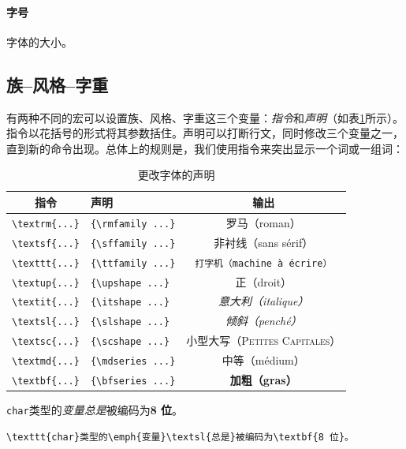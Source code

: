 \paragraph*{字号}字{\large 体}{\Large 的}{\LARGE 大}{\small 小}。

\subsection{族--风格--字重}

有两种不同的宏可以设置族、风格、字重这三个变量：\emph{指令}和\emph{声明}（如表\ref{tab:2.1}所示）。指令以花括号的形式将其参数括住。声明可以打断行文，同时修改三个变量之一，直到新的命令出现。总体上的规则是，我们使用指令来突出显示一个词或一组词：

\begin{table}
    \centering
    \begin{tabular}{|c|l|c|}
\hline
指令 & 声明 & 输出\\
\hline
\verb+\textrm{...}+ & \verb+{\rmfamily ...}+ & 罗马（roman） \\
\verb+\textsf{...}+ & \verb+{\sffamily ...}+ & \textsf{非衬线（sans sérif）} \\
\verb+\texttt{...}+ & \verb+{\ttfamily ...}+ & \texttt{打字机（machine à écrire）} \\
\hline
\verb+\textup{...}+ & \verb+{\upshape ...}+ & 正（droit） \\
\verb+\textit{...}+ & \verb+{\itshape ...}+ & \textit{意大利（italique）} \\
\verb+\textsl{...}+ & \verb+{\slshape ...}+ & \textsl{倾斜（penché）} \\
\verb+\textsc{...}+ & \verb+{\scshape ...}+ & \textsc{小型大写（Petites Capitales）} \\
\hline
\verb+\textmd{...}+ & \verb+{\mdseries ...}+ & 中等（médium） \\
\verb+\textbf{...}+ & \verb+{\bfseries ...}+ & \textbf{加粗（gras）} \\
\hline
    \end{tabular}
    \caption{更改字体的声明}
    \label{tab:2.1}
\end{table}

\begin{codelist}[2.1]{
    \texttt{char}类型的\emph{变量}\textsl{总是}被编码为\textbf{8 位}。
}
\begin{verbatim}
\texttt{char}类型的\emph{变量}\textsl{总是}被编码为\textbf{8 位}。
\end{verbatim}
\end{codelist}

